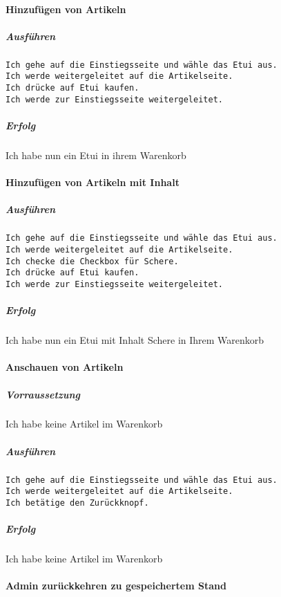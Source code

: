 \documentclass[a4paper, 11pt]{article}
\begin{document}
\paragraph{Hinzufügen von Artikeln}

\subparagraph{Ausführen}

\begin{verbatim}
Ich gehe auf die Einstiegsseite und wähle das Etui aus.
Ich werde weitergeleitet auf die Artikelseite.
Ich drücke auf Etui kaufen.
Ich werde zur Einstiegsseite weitergeleitet.
\end{verbatim}

\subparagraph{Erfolg}

Ich habe nun ein Etui in ihrem Warenkorb

\paragraph{Hinzufügen von Artikeln mit Inhalt}

\subparagraph{Ausführen}

\begin{verbatim}
Ich gehe auf die Einstiegsseite und wähle das Etui aus.
Ich werde weitergeleitet auf die Artikelseite.
Ich checke die Checkbox für Schere.
Ich drücke auf Etui kaufen.
Ich werde zur Einstiegsseite weitergeleitet.
\end{verbatim}

\subparagraph{Erfolg}

Ich habe nun ein Etui mit Inhalt Schere in Ihrem Warenkorb

\paragraph{Anschauen von Artikeln}

\subparagraph{Vorraussetzung}

Ich habe keine Artikel im Warenkorb

\subparagraph{Ausführen}

\begin{verbatim}
Ich gehe auf die Einstiegsseite und wähle das Etui aus.
Ich werde weitergeleitet auf die Artikelseite.
Ich betätige den Zurückknopf.
\end{verbatim}

\subparagraph{Erfolg}

Ich habe keine Artikel im Warenkorb

\paragraph{Admin zurückkehren zu gespeichertem Stand}
\end{document}
